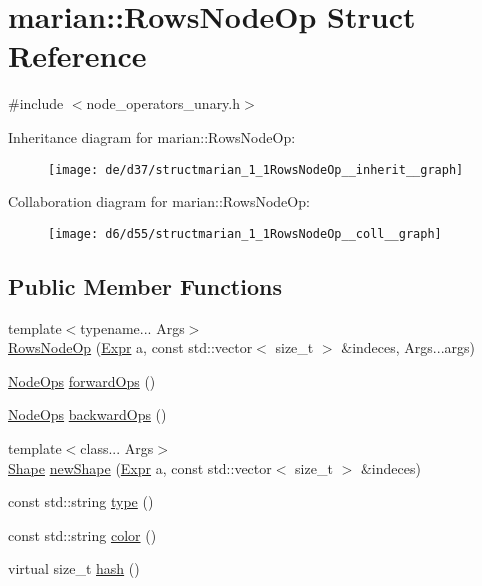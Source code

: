 \hypertarget{structmarian_1_1RowsNodeOp}{}\section{marian\+:\+:Rows\+Node\+Op Struct Reference}
\label{structmarian_1_1RowsNodeOp}


{\ttfamily \#include $<$node\+\_\+operators\+\_\+unary.\+h$>$}



Inheritance diagram for marian\+:\+:Rows\+Node\+Op\+:
\nopagebreak
\begin{figure}[H]
\begin{center}
\leavevmode
\texttt{[image: de/d37/structmarian\_1\_1RowsNodeOp\_\_inherit\_\_graph]}
\end{center}
\end{figure}


Collaboration diagram for marian\+:\+:Rows\+Node\+Op\+:
\nopagebreak
\begin{figure}[H]
\begin{center}
\leavevmode
\texttt{[image: d6/d55/structmarian\_1\_1RowsNodeOp\_\_coll\_\_graph]}
\end{center}
\end{figure}
\subsection*{Public Member Functions}
\begin{DoxyCompactItemize}
\item 
{\footnotesize template$<$typename... Args$>$ }\\\hyperlink{structmarian_1_1RowsNodeOp_aa3d6bae3ede50be28d7ecb8a500da5f6}{Rows\+Node\+Op} (\hyperlink{namespacemarian_a498d8baf75b754011078b890b39c8e12}{Expr} a, const std\+::vector$<$ size\+\_\+t $>$ \&indeces, Args...\+args)
\item 
\hyperlink{namespacemarian_a4956376218cc236016c20bc4071470da}{Node\+Ops} \hyperlink{structmarian_1_1RowsNodeOp_a4a65cd8cff116fe1f8ae51ea0b10381c}{forward\+Ops} ()
\item 
\hyperlink{namespacemarian_a4956376218cc236016c20bc4071470da}{Node\+Ops} \hyperlink{structmarian_1_1RowsNodeOp_a09fcd9c3cd6c67f9c0ab37c48d9c41cd}{backward\+Ops} ()
\item 
{\footnotesize template$<$class... Args$>$ }\\\hyperlink{structmarian_1_1Shape}{Shape} \hyperlink{structmarian_1_1RowsNodeOp_ae973282fa06756d61cd0827136138dad}{new\+Shape} (\hyperlink{namespacemarian_a498d8baf75b754011078b890b39c8e12}{Expr} a, const std\+::vector$<$ size\+\_\+t $>$ \&indeces)
\item 
const std\+::string \hyperlink{structmarian_1_1RowsNodeOp_a6d8356e3da82ef0bcfbbe832423fc9c0}{type} ()
\item 
const std\+::string \hyperlink{structmarian_1_1RowsNodeOp_ab00d9d52a8dc80de0655d1cab56a8718}{color} ()
\item 
virtual size\+\_\+t \hyperlink{structmarian_1_1RowsNodeOp_ab673a759e07f33c57da2bb4e02082b25}{hash} ()
\end{DoxyCompactItemize}
